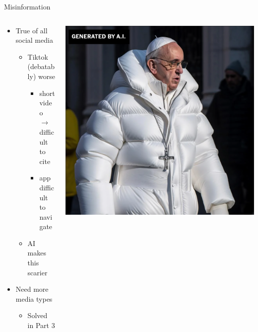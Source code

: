 \documentclass[aspectratio=169]{beamer}
\begin{document}
\begin{frame}{Misinformation}
\begin{columns}[T]
    \begin{column}[T]{0.5\textwidth}
        \begin{itemize}
            \item True of all social media
            \begin{itemize}
                \item Tiktok (debatably) worse
                \begin{itemize}
                    \item short video $\rightarrow$ difficult to cite
                    \item app difficult to navigate
                \end{itemize}
            \item AI makes this scarier
            \end{itemize}
        \item Need more media types
        \begin{itemize}
            \item Solved in Part 3
        \end{itemize}
    \end{itemize}
    \end{column}
    \begin{column}{0.5\textwidth}
        \includegraphics[height=0.8\textheight]{imgs/why_replace/pope.png}
    \end{column}
\end{columns}
\end{frame}
\end{document}
